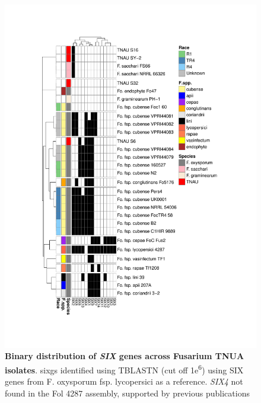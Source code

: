 \begin{figure}[htp!]
  \centering
  \includegraphics[width=15cm]{Figures/Heatmap.pdf}
  \caption[Binary distribution of \textit{SIX} genes across Fusarium TNUA isolates]{\textbf{Binary distribution of \textit{SIX} genes across Fusarium TNUA isolates}. \aclp{sixg} identified using TBLASTN (cut off 1\-e\textsuperscript{6}) using SIX genes from F. oxysporum fsp. lycopersici as a reference. \textit{SIX4} not found in the \acl{Fol} 4287 assembly, supported by previous publications \parencite{Czislowski2018}}
  \label{fig:SixTNAU}
\end{figure}

